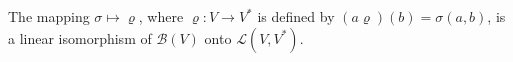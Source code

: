 The mapping $\sigma \mapsto \varrho$, where $\varrho: V \to V^*$ is defined by $(a\varrho)(b) = \sigma(a, b)$, is a linear isomorphism of $\mathcal{B}(V)$ onto $\mathcal{L}(V, V^*)$.
